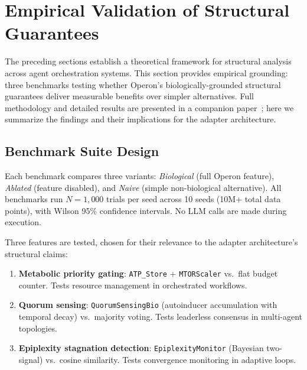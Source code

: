 \documentclass[11pt]{article}
\begin{document}

\section{Empirical Validation of Structural Guarantees}\label{sec:empirical}

The preceding sections establish a theoretical framework for structural
analysis across agent orchestration systems.  This section provides
empirical grounding: three benchmarks testing whether Operon's
biologically-grounded structural guarantees deliver measurable benefits
over simpler alternatives.  Full methodology and detailed results are
presented in a companion paper~\cite{banu2026benchmarks}; here we
summarize the findings and their implications for the adapter
architecture.

\subsection{Benchmark Suite Design}

Each benchmark compares three variants: \emph{Biological} (full Operon
feature), \emph{Ablated} (feature disabled), and \emph{Naive} (simple
non-biological alternative).  All benchmarks run $N = 1{,}000$ trials
per seed across 10 seeds (10M+ total data points), with Wilson 95\%
confidence intervals.  No LLM calls are made during execution.

Three features are tested, chosen for their relevance to the adapter
architecture's structural claims:

\begin{enumerate}[nosep]
  \item \textbf{Metabolic priority gating}: \texttt{ATP\_Store} +
        \texttt{MTORScaler} vs.\ flat budget counter.  Tests resource
        management in orchestrated workflows.
  \item \textbf{Quorum sensing}: \texttt{QuorumSensingBio}
        (autoinducer accumulation with temporal decay) vs.\ majority
        voting.  Tests leaderless consensus in multi-agent topologies.
  \item \textbf{Epiplexity stagnation detection}:
        \texttt{EpiplexityMonitor} (Bayesian two-signal) vs.\ cosine
        similarity.  Tests convergence monitoring in adaptive loops.
\end{enumerate}
\end{document}
